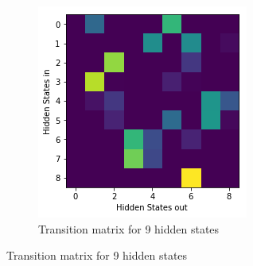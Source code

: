 \begin{figure}[H]
	\centering
	\begin{subfigure}[t]{0.3\textwidth}
		\includegraphics[width=\textwidth]{9x9Transition.png}
		\caption{Transition matrix for 9 hidden states}
	\end{subfigure}%

	\bigskip 


\end{figure}
